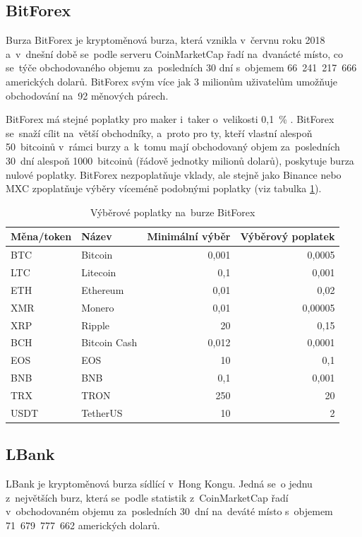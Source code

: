 \documentclass[thesis=B,czech]{FITthesis}[2019/03/21]
\begin{document}
\subsection{BitForex}
Burza BitForex je kryptoměnová burza, která vznikla v~červnu roku 2018 a~v~dnešní době se~podle serveru CoinMarketCap řadí na~dvanácté místo, co se~týče obchodovaného objemu za~posledních 30 dní s~objemem 66~241~217~666 amerických dolarů. \cite{coinmarketcap} BitForex svým více jak 3 milionům uživatelům \linebreak umožňuje obchodování na~92 měnových párech.  \cite{cryptowisser_bitforex}

BitForex má stejné poplatky pro maker i~taker o~velikosti 0,1~\% . BitForex se~snaží cílit na~větší obchodníky, a~proto pro ty, kteří vlastní alespoň 50~bitcoinů v~rámci burzy a~k~tomu mají obchodovaný objem za~posledních 30~dní alespoň 1000~bitcoinů (řádově jednotky milionů dolarů), poskytuje burza nulové poplatky. BitForex nezpoplatňuje vklady, ale stejně jako Binance nebo MXC zpoplatňuje výběry víceméně podobnými poplatky (viz tabulka \ref{bitforex_fees}). \cite{cryptowisser_bitforex}

\begin{table}\centering
    \caption{Výběrové poplatky na~burze BitForex \cite{bitforex_fees}}
    \label{bitforex_fees}
    \begin{tabular}{||l | l | r | r||} 
     \hline
     Měna/token & Název & Minimální výběr & Výběrový poplatek \\ [0.5ex] 
     \hline\hline
     BTC & Bitcoin & 0,001 & 0,0005 \\ 
     \hline
     LTC & Litecoin & 0,1 & 0,001 \\
     \hline
     ETH & Ethereum & 0,01 & 0,02 \\
     \hline
     XMR & Monero & 0,01 & 0,00005 \\
     \hline
     XRP & Ripple & 20 & 0,15 \\
     \hline
     BCH & Bitcoin Cash & 0,012 & 0,0001 \\
     \hline
     EOS & EOS & 10 & 0,1 \\
     \hline
     BNB & BNB & 0,1 & 0,001 \\
     \hline
     TRX & TRON & 250 & 20 \\
     \hline
     USDT & TetherUS & 10 & 2 \\
     \hline
    \end{tabular}
\end{table}

\subsection{LBank}
LBank je kryptoměnová burza sídlící v~Hong Kongu. Jedná se~o jednu \linebreak z~největších burz, která se~podle statistik z~CoinMarketCap řadí v~obchodovaném objemu za~posledních 30~dní na~deváté místo s~objemem 71~679~777~662 amerických dolarů. \cite{coinmarketcap} \cite{cryptowisser_lbank}
\end{document}
